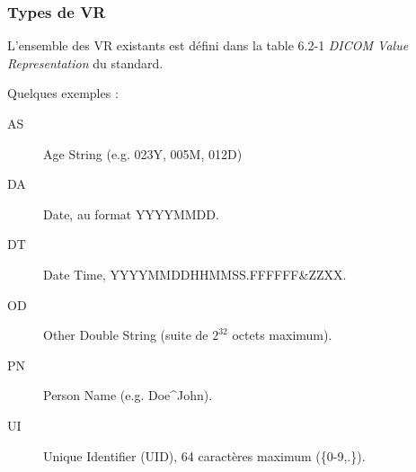 \frame
{
    \frametitle{Types de VR}
    L'ensemble des VR existants est d\'efini dans la table 6.2-1 \emph{DICOM Value Representation} du standard.

    Quelques exemples :
    \begin{description}
        \item[AS] Age String (e.g. 023Y, 005M, 012D)
        \item[DA] Date, au format YYYYMMDD.
        \item[DT] Date Time, YYYYMMDDHHMMSS.FFFFFF\&ZZXX.
        \item[OD] Other Double String (suite de $2^32$ octets maximum).
        \item[PN] Person Name (e.g. Doe\^{}John).
        \item[UI] Unique Identifier (UID), 64 caractères maximum (\{0-9,.\}).
    \end{description}
}


